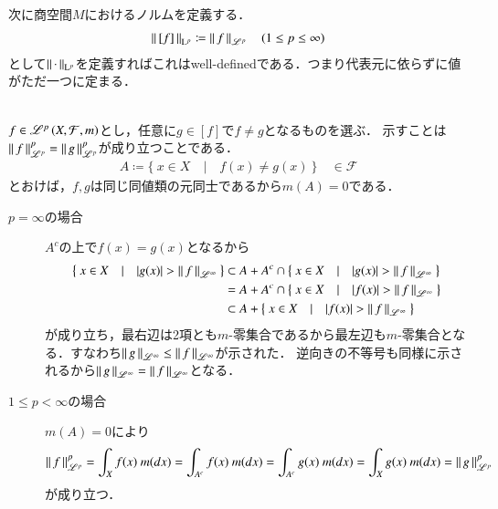 次に商空間$M$におけるノルムを定義する．
\begin{align}
	\left\|\, [f]\, \right\|_{\mathrm{L}^p} \coloneqq \left\|\, f\, \right\|_{\mathscr{L}^p} \quad (1 \leq p \leq \infty)
\end{align}
として$\left\|\, \cdot\, \right\|_{\mathrm{L}^p}$を定義すればこれはwell-definedである．つまり代表元に依らずに値がただ一つに定まる．
\begin{bcs}\mbox{}\\
	$f \in \mathscr{L}^{p} \left(X,\mathcal{F},m\right)$とし，任意に$g \in [f]$で$f \neq g$となるものを選ぶ．
	示すことは$\left\|\, f\, \right\|_{\mathscr{L}^p}^p = \left\|\, g\, \right\|_{\mathscr{L}^p}^p$が成り立つことである．
	\begin{align}
		A \coloneqq \{\ x \in X\quad |\quad f(x) \neq g(x)\ \} \quad \in \mathcal{F}
	\end{align}
	とおけば，$f,g$は同じ同値類の元同士であるから$m(A)=0$である．
	\begin{description}
		\item[$p = \infty$の場合]
			$A^c$の上で$f(x)=g(x)$となるから
			\begin{align}
				\left\{\ x \in X\quad |\quad |g(x)| > \left\|\, f\, \right\|_{\mathscr{L}^\infty}\ \right\} 
				&\subset A + A^c \cap \left\{\ x \in X\quad |\quad |g(x)| > \left\|\, f\, \right\|_{\mathscr{L}^\infty}\ \right\} \\
				&= A + A^c \cap \left\{\ x \in X\quad |\quad |f(x)| > \left\|\, f\, \right\|_{\mathscr{L}^\infty}\ \right\} \\
				&\subset A + \left\{\ x \in X\quad |\quad |f(x)| > \left\|\, f\, \right\|_{\mathscr{L}^\infty}\ \right\}
			\end{align}
			が成り立ち，最右辺は2項とも$m$-零集合であるから最左辺も$m$-零集合となる．すなわち$\left\|\, g\, \right\|_{\mathscr{L}^\infty} \leq \left\|\, f\, \right\|_{\mathscr{L}^\infty}$が示された．
			逆向きの不等号も同様に示されるから$\left\|\, g\, \right\|_{\mathscr{L}^\infty} = \left\|\, f\, \right\|_{\mathscr{L}^\infty}$となる．
		\item[$1 \leq p < \infty$の場合]
			$m(A)=0$により
			\begin{align}
				\left\|\, f\, \right\|_{\mathscr{L}^p}^p = \int_X f(x)\ m(dx) = \int_{A^c} f(x)\ m(dx) = \int_{A^c} g(x)\ m(dx) = \int_X g(x)\ m(dx) = \left\|\, g\, \right\|_{\mathscr{L}^p}^p
			\end{align}
			が成り立つ．
	\end{description}
	\QED
\end{bcs}

